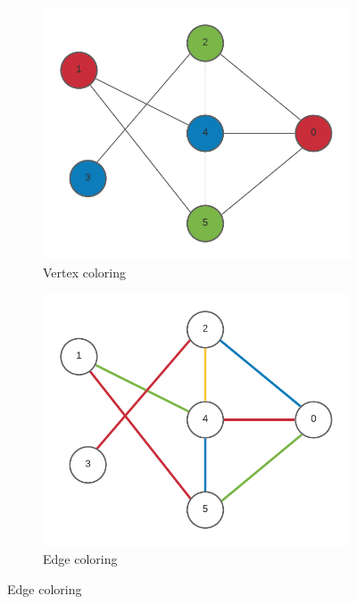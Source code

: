 \begin{figure}
  \centering
  \begin{subfigure}[b]{0.49\textwidth}
      \centering
      \includegraphics[width=\textwidth]{images/vertex-coloring.pdf}
      \caption{Vertex coloring}
      \label{fig:vertex-coloring}
  \end{subfigure}
  \hfill
  \begin{subfigure}[b]{0.49\textwidth}
      \centering
      \includegraphics[width=\textwidth]{images/edge-coloring.pdf}
      \caption{Edge coloring}
      \label{fig:edge-coloring}
  \end{subfigure}


\end{figure}
